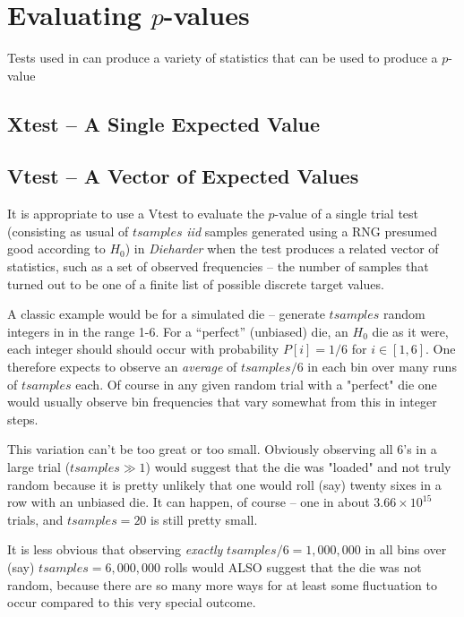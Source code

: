 \documentclass{book}
\begin{document}
\chapter{Evaluating $p$-values}

Tests used in \die can produce a variety of statistics that can be
used to produce a $p$-value

\section{Xtest -- A Single Expected Value}

\section{Vtest -- A Vector of Expected Values}

It is appropriate to use a Vtest to evaluate the $p$-value of a single
trial test (consisting as usual of $tsamples$ {\em iid} samples
generated using a RNG presumed good according to $H_0$) in {\em
Dieharder} when the test produces a related vector of statistics, such
as a set of observed frequencies -- the number of samples that turned
out to be one of a finite list of possible discrete target values.

A classic example would be for a simulated die -- generate $tsamples$
random integers in in the range 1-6.  For a ``perfect'' (unbiased) die,
an $H_0$ die as it were, each integer should should occur with
probability $P[i] = 1/6$ for $i\in [1,6]$.  One therefore expects to
observe an {\em average} of $tsamples/6$ in each bin over many runs of
$tsamples$ each.  Of course in any given random trial with a "perfect"
die one would usually observe bin frequencies that vary somewhat from
this in integer steps.

This variation can't be too great or too small.  Obviously observing all
6's in a large trial ($tsamples \gg 1$) would suggest that the die was
"loaded" and not truly random because it is pretty unlikely that one
would roll (say) twenty sixes in a row with an unbiased die.  It can
happen, of course -- one in about $3.66\times10^{15}$ trials, and
$tsamples = 20$ is still pretty small.

It is less obvious that observing {\em exactly} $tsamples/6 = 1,000,000$
in all bins over (say) $tsamples = 6,000,000$ rolls would ALSO suggest
that the die was not random, because there are so many more ways for at
least some fluctuation to occur compared to this very special outcome.
\end{document}
